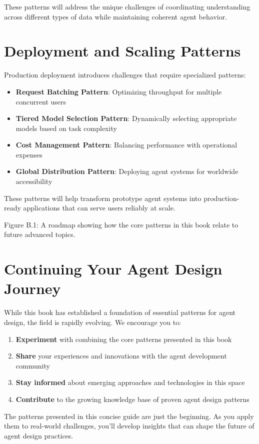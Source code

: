 \documentclass[11pt,oneside]{book}
\providecommand{\tightlist}{%
  \setlength{\itemsep}{0pt}\setlength{\parskip}{0pt}}
\begin{document}
These patterns will address the unique challenges of coordinating
understanding across different types of data while maintaining coherent
agent behavior.

\section{Deployment and Scaling
Patterns}\label{deployment-and-scaling-patterns}

Production deployment introduces challenges that require specialized
patterns:

\begin{itemize}
\tightlist
\item
  \textbf{Request Batching Pattern}: Optimizing throughput for multiple
  concurrent users
\item
  \textbf{Tiered Model Selection Pattern}: Dynamically selecting
  appropriate models based on task complexity
\item
  \textbf{Cost Management Pattern}: Balancing performance with
  operational expenses
\item
  \textbf{Global Distribution Pattern}: Deploying agent systems for
  worldwide accessibility
\end{itemize}

These patterns will help transform prototype agent systems into
production-ready applications that can serve users reliably at scale.

Figure B.1: A roadmap showing how the core patterns in this book relate
to future advanced topics.

\section{Continuing Your Agent Design
Journey}\label{continuing-your-agent-design-journey}

While this book has established a foundation of essential patterns for
agent design, the field is rapidly evolving. We encourage you to:

\begin{enumerate}
\def\labelenumi{\arabic{enumi}.}
\tightlist
\item
  \textbf{Experiment} with combining the core patterns presented in this
  book
\item
  \textbf{Share} your experiences and innovations with the agent
  development community
\item
  \textbf{Stay informed} about emerging approaches and technologies in
  this space
\item
  \textbf{Contribute} to the growing knowledge base of proven agent
  design patterns
\end{enumerate}

The patterns presented in this concise guide are just the beginning. As
you apply them to real-world challenges, you'll develop insights that
can shape the future of agent design practices.
\end{document}
